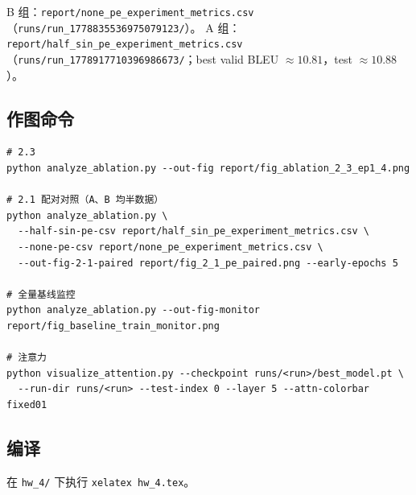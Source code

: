 \documentclass[UTF8,a4paper,11pt]{ctexart}
\begin{document}
B 组：\texttt{report/none\_pe\_experiment\_metrics.csv}（\texttt{runs/run\_1778835536975079123/}）。
A 组：\texttt{report/half\_sin\_pe\_experiment\_metrics.csv}（\texttt{runs/run\_1778917710396986673/}；best valid BLEU $\approx 10.81$，test $\approx 10.88$）。

\subsection{作图命令}

\begin{verbatim}
# 2.3
python analyze_ablation.py --out-fig report/fig_ablation_2_3_ep1_4.png

# 2.1 配对对照（A、B 均半数据）
python analyze_ablation.py \
  --half-sin-pe-csv report/half_sin_pe_experiment_metrics.csv \
  --none-pe-csv report/none_pe_experiment_metrics.csv \
  --out-fig-2-1-paired report/fig_2_1_pe_paired.png --early-epochs 5

# 全量基线监控
python analyze_ablation.py --out-fig-monitor report/fig_baseline_train_monitor.png

# 注意力
python visualize_attention.py --checkpoint runs/<run>/best_model.pt \
  --run-dir runs/<run> --test-index 0 --layer 5 --attn-colorbar fixed01
\end{verbatim}

\subsection{编译}

在 \texttt{hw\_4/} 下执行 \texttt{xelatex hw\_4.tex}。
\end{document}
